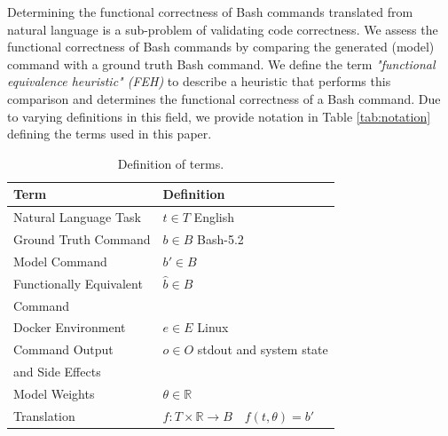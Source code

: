 \documentclass[11pt]{article}
\begin{document}
Determining the functional correctness of Bash commands translated from natural language is a sub-problem of validating code correctness. We assess the functional correctness of Bash commands by comparing the generated (model) command with a ground truth Bash command. We define the term \textit{"functional equivalence heuristic" (FEH)} to describe a heuristic that performs this comparison and determines the functional correctness of a Bash command. Due to varying definitions in this field, we provide notation in Table \ref{tab:notation} defining the terms used in this paper.

\begin{table}[ht!]
  \centering
  \scriptsize
  \caption{Definition of terms.}
  \renewcommand{\arraystretch}{1.3}
  \begin{tabular}{ll}
    \hline
    \textbf{Term}           & \textbf{Definition}                                                           \\
    \hline
    Natural Language Task   & \( t \in T \) English                                                         \\
    \hline
    Ground Truth Command    & \( b \in B \) Bash-5.2                                                        \\
    \hline
    Model Command           & \( b' \in B \)                                                                \\
    \hline
    Functionally Equivalent & \( \hat{b} \in B \)                                                           \\
    Command                 &                                                                               \\
    \hline
    Docker Environment      & \( e \in E \) Linux                                                           \\
    \hline
    Command Output          & \( o \in O \) stdout and system state                                         \\
    and Side Effects        &                                                                               \\
    \hline
    Model Weights           & \( \theta \in \mathbb{R} \)                                                   \\
    \hline
    Translation             & \( f: T \times \mathbb{R} \rightarrow B \quad f(t, \theta) = b' \)            \\

\end{tabular}
\end{table}
\end{document}
